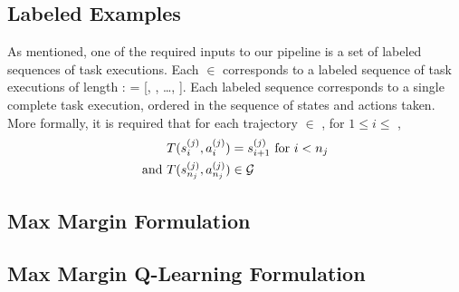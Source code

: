 \subsection{Labeled Examples}
\label{subsec:labeledex}

As mentioned, one of the required inputs to our pipeline is a set 
of labeled sequences of task executions. Each  $\in$ 
corresponds to a labeled sequence of
task executions of length :  = [,
, \ldots, ]. Each labeled sequence corresponds
to a single complete task execution, ordered in the sequence of states and
actions taken. More formally, it is required that for each trajectory
 $\in$ , for $1 \leq i \leq$ ,
\begin{align*}
T(s_{i}^{(j)}, a_{i}^{(j)}) &= s_{i+1}^{(j)} \text{ for } i < n_{j} \\
\text{and } T(s_{n_{j}}^{(j)}, a_{n_{j}}^{(j)}) &\in \mathcal{G}{}
\end{align*}

\subsection{Max Margin Formulation}


\subsection{Max Margin Q-Learning Formulation}
